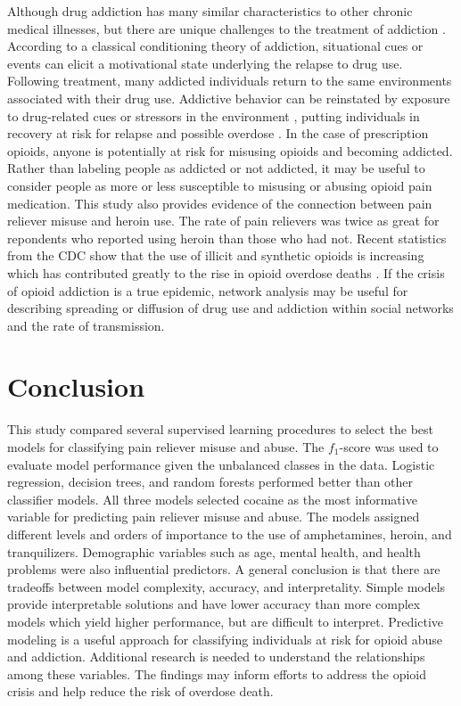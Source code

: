 \documentclass[sigconf]{acmart}
\begin{document}
Although drug addiction has many similar characteristics to other chronic 
medical illnesses, but there are unique challenges to the treatment of 
addiction \cite{marsch12, swendson16}. According to a classical conditioning 
theory of addiction, situational cues or events can elicit a motivational 
state underlying the relapse to drug use. Following treatment, many addicted individuals return to the same environments associated with their drug use. 
Addictive behavior can be reinstated by exposure to drug-related cues or 
stressors in the environment \cite{shaham03}, putting individuals in 
recovery at risk for relapse and possible overdose \cite{johnson11}. In the 
case of prescription opioids, anyone is potentially at risk for misusing 
opioids and becoming addicted. Rather than labeling people as addicted or 
not addicted, it may be useful to consider people as more or less susceptible 
to misusing or abusing opioid pain medication. This study also provides 
evidence of the connection between pain reliever misuse and heroin use. The
rate of pain relievers was twice as great for repondents who reported using
heroin than those who had not. Recent statistics from the CDC show that the
use of illicit and synthetic opioids is increasing which has contributed 
greatly to the rise in opioid overdose deaths \cite{cdc18}. If the crisis of 
opioid addiction is a true epidemic, network analysis may be useful for
describing spreading or diffusion of drug use and addiction within social 
networks and the rate of transmission. 

\section{Conclusion}

This study compared several supervised learning procedures to select the best 
models for classifying pain reliever misuse and abuse. The $f_1$-score was used 
to evaluate model performance given the unbalanced classes in the data. 
Logistic regression, decision trees, and random forests performed better than
other classifier models. All three models selected cocaine as the most 
informative variable for predicting pain reliever misuse and abuse. The
models assigned different levels and orders of importance to the use of
amphetamines, heroin, and tranquilizers. Demographic variables such as age, 
mental health, and health problems were also influential predictors. 
A general conclusion is that there are tradeoffs between model complexity, 
accuracy, and interpretality. Simple models provide interpretable solutions 
and have lower accuracy than more complex models which yield higher performance, 
but are difficult to interpret. Predictive modeling is a useful approach 
for classifying individuals at risk for opioid abuse and addiction. Additional 
research is needed to understand the relationships among these variables.
The findings may inform efforts to address the opioid crisis and help 
reduce the risk of overdose death. 
\end{document}
